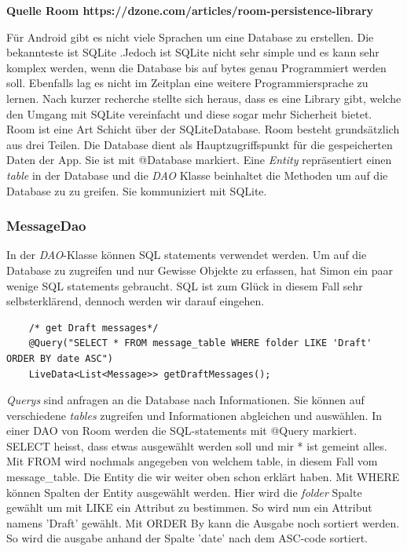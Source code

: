 \documentclass[a4paper,11pt]{article}
\begin{document}
\textbf{ Quelle Room https://dzone.com/articles/room-persistence-library}

Für Android gibt es nicht viele Sprachen um eine Database zu erstellen. Die bekannteste ist SQLite .Jedoch ist SQLite nicht sehr simple und es kann sehr komplex werden, wenn
die Database bis auf bytes genau Programmiert werden soll. Ebenfalls lag es nicht im Zeitplan eine weitere Programmiersprache zu lernen. Nach kurzer 
recherche stellte sich heraus, dass es eine Library gibt, welche den Umgang mit SQLite vereinfacht und diese sogar mehr Sicherheit bietet. Room ist eine Art Schicht über der SQLiteDatabase. 
Room besteht grundsätzlich aus drei Teilen. Die Database dient als Hauptzugriffspunkt für die gespeicherten Daten der App. Sie ist mit @Database markiert. 
Eine \textit{Entity} repräsentiert einen \textit{table} in der Database und die \textit{DAO} Klasse beinhaltet die Methoden um auf die Database zu zu greifen. Sie kommuniziert
mit SQLite. 


\subsubsection{MessageDao}

In der \textit{DAO}-Klasse können SQL statements verwendet werden. Um auf die Database zu zugreifen und nur Gewisse 
Objekte zu erfassen, hat Simon ein paar wenige SQL statements gebraucht. SQL ist zum Glück in diesem Fall sehr selbsterklärend, 
dennoch werden wir darauf eingehen.\\


\lstset{language=SQL}
\begin{lstlisting}
    /* get Draft messages*/
    @Query("SELECT * FROM message_table WHERE folder LIKE 'Draft' ORDER BY date ASC")
    LiveData<List<Message>> getDraftMessages();
\end{lstlisting}

\textit{Querys} sind anfragen an die Database nach Informationen. Sie können auf verschiedene \textit{tables} zugreifen und Informationen abgleichen und auswählen. 
In einer DAO von Room werden die SQL-statements mit @Query markiert. SELECT heisst, dass etwas ausgewählt werden soll und mir * ist gemeint alles. Mit FROM wird nochmals angegeben von 
welchem table, in diesem Fall vom message\_table. Die Entity die wir weiter oben schon erklärt haben. Mit WHERE können Spalten der Entity ausgewählt werden. Hier wird die \textit{folder} Spalte 
gewählt um mit LIKE ein Attribut zu bestimmen. So wird nun ein Attribut namens 'Draft' gewählt. Mit ORDER By kann die Ausgabe noch sortiert werden. So wird die ausgabe anhand der Spalte 'date'
nach dem ASC-code sortiert.
\end{document}
